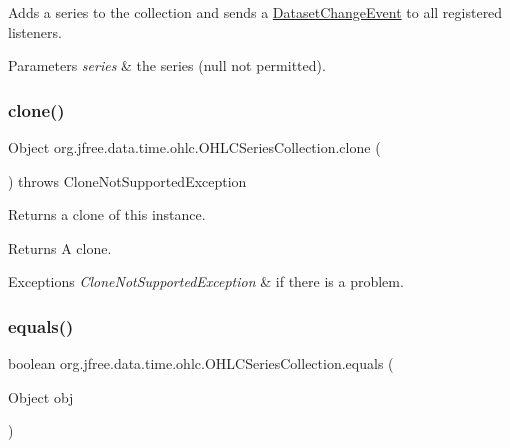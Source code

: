Adds a series to the collection and sends a \mbox{\hyperlink{}{Dataset\+Change\+Event}} to all registered listeners.


\begin{DoxyParams}{Parameters}
{\em series} & the series ({\ttfamily null} not permitted). \\
\hline
\end{DoxyParams}
\mbox{\label{classorg_1_1jfree_1_1data_1_1time_1_1ohlc_1_1_o_h_l_c_series_collection_a24b1ac1339e833f77fa1b69e0814479a}} 
\subsubsection{\texorpdfstring{clone()}{clone()}}
{\footnotesize\ttfamily Object org.\+jfree.\+data.\+time.\+ohlc.\+O\+H\+L\+C\+Series\+Collection.\+clone (\begin{DoxyParamCaption}{ }\end{DoxyParamCaption}) throws Clone\+Not\+Supported\+Exception}

Returns a clone of this instance.

\begin{DoxyReturn}{Returns}
A clone.
\end{DoxyReturn}

\begin{DoxyExceptions}{Exceptions}
{\em Clone\+Not\+Supported\+Exception} & if there is a problem. \\
\hline
\end{DoxyExceptions}
\mbox{\label{classorg_1_1jfree_1_1data_1_1time_1_1ohlc_1_1_o_h_l_c_series_collection_aa97178757d8bccb01f9edfe41405a7c3}} 
\subsubsection{\texorpdfstring{equals()}{equals()}}
{\footnotesize\ttfamily boolean org.\+jfree.\+data.\+time.\+ohlc.\+O\+H\+L\+C\+Series\+Collection.\+equals (\begin{DoxyParamCaption}\item[{Object}]{obj }\end{DoxyParamCaption})}

